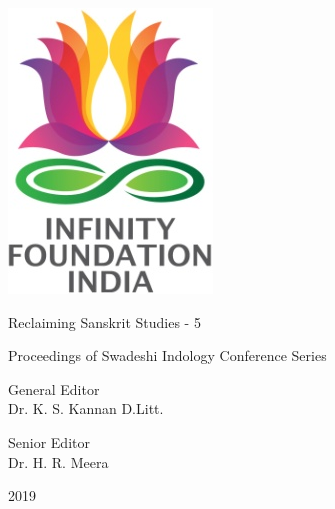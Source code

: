 \thispagestyle{empty}

\includegraphics{images/logo.png}

Reclaiming Sanskrit Studies - 5


Proceedings of Swadeshi Indology Conference Series

General Editor\\ Dr. K. S. Kannan D.Litt.

Senior Editor\\ Dr. H. R. Meera


2019

